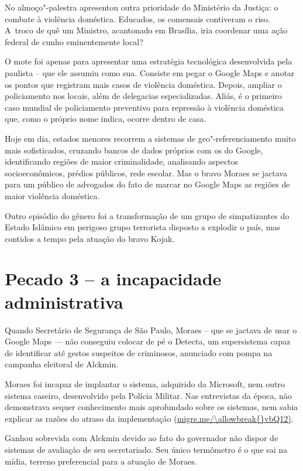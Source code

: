 No almoço"-palestra apresentou outra prioridade do Ministério da Justiça:
o combate à violência doméstica. Educados, os comensais contiveram o
riso. A~troco de quê um Ministro, acantonado em Brasília, iria coordenar
uma ação federal de cunho eminentemente local?

O mote foi apenas para apresentar uma estratégia tecnológica
desenvolvida pela  paulista -- que ele assumiu como sua. Consiste em
pegar o Google Maps e anotar os pontos que registram mais casos de
violência doméstica. Depois, ampliar o policiamento nos locais, além de
delegacias especializadas. Aliás, é o primeiro caso mundial de
policiamento preventivo para repressão à violência doméstica que, como o
próprio nome indica, ocorre dentro de casa.

Hoje em dia, estados menores recorrem a sistemas de geo"-referenciamento
muito mais sofisticados, cruzando bancos de dados próprios com os do
Google, identificando regiões de maior criminalidade, analisando
aspectos socioeconômicos, prédios públicos, rede escolar. Mas o bravo
Moraes se jactava para um público de advogados do fato de marcar no
Google Maps as regiões de maior violência doméstica.

Outro episódio do gênero foi a transformação de um grupo de
simpatizantes do Estado Islâmico em perigoso grupo terrorista disposto a
explodir o país, mas contidos a tempo pela atuação do bravo Kojak.

\section{Pecado 3 -- a incapacidade administrativa}

Quando Secretário de Segurança de São Paulo, Moraes -- que se jactava de
usar o Google Maps --- não conseguiu colocar de pé o Detecta, um
supersistema capaz de identificar até gestos suspeitos de criminosos,
anunciado com pompa na campanha eleitoral de Alckmin.

Moraes foi incapaz de implantar o sistema, adquirido da Microsoft, nem
outro sistema caseiro, desenvolvido pela Polícia Militar. Nas
entrevistas da época, não demonstrava sequer conhecimento mais
aprofundado sobre os sistemas, nem sabia explicar as razões do atraso da
implementação (\url{migre.me/\allowbreak{}vbQ12)}.

Ganhou sobrevida com Alckmin devido ao fato do governador não dispor de
sistemas de avaliação de seu secretariado. Seu único termômetro é o que
sai na mídia, terreno preferencial para a atuação de Moraes.

